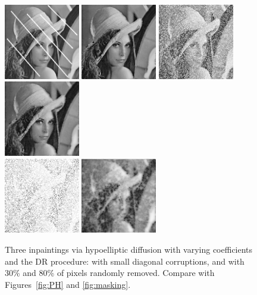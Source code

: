 \documentclass[proc]{edpsmath}
\begin{document}
\begin{figure}
  \includegraphics[height=3.3cm]{imgs/lena-diag}
  \includegraphics[height = 3.3cm]{imgs/lena-varying}\qquad
  \includegraphics[height=3.3cm]{imgs/lena-random-30}
  \includegraphics[height = 3.3cm]{imgs/lena-random-30-varying}\\ \vspace{.5em}
    \includegraphics[height=3.3cm]{imgs/lena-random-80}
  \includegraphics[height = 3.3cm]{imgs/lena-random-80-varying}\qquad
  \caption{Three inpaintings via hypoelliptic diffusion with varying coefficients and the DR procedure: with small diagonal corruptions, and with 30\% and 80\% of pixels randomly removed. Compare with Figures~\ref{fig:PH} and \ref{fig:masking}.}
  \label{fig:varying}
\end{figure}
\end{document}

